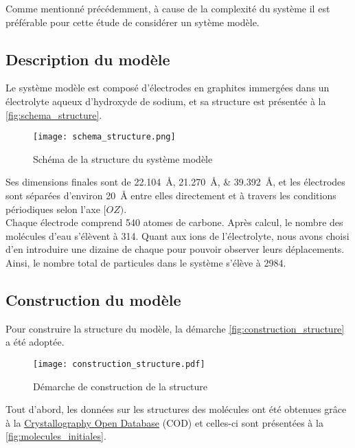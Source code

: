 Comme mentionné précédemment, à cause de la complexité du système il est préférable pour cette étude de considérer un sytème modèle.

    \subsection{Description du modèle}

Le système modèle est composé d'électrodes en graphites immergées dans un électrolyte aqueux d'hydroxyde de sodium, et sa structure est présentée à la \autoref{fig:schema_structure}.

\begin{figure}[htp]
    \centering
    \texttt{[image: schema\_structure.png]}
    \caption{Schéma de la structure du système modèle}
    \label{fig:schema_structure}
\end{figure}

Ses dimensions finales sont de \qtylist[list-units = single]{22.104;21.270;39.392}{\angstrom}, et les électrodes sont séparées d'environ \qty{20}{\angstrom} entre elles directement et à travers les conditions périodiques selon l'axe $[OZ)$.\\
Chaque électrode comprend \num{540} atomes de carbone. Après calcul, le nombre des molécules d'eau s'élèvent à \num{314}. Quant aux ions de l'électrolyte, nous avons choisi d'en introduire une dizaine de chaque pour pouvoir observer leurs déplacements.\\
Ainsi, le nombre total de particules dans le système s'élève à \num{2984}.

    \subsection{Construction du modèle}

Pour construire la structure du modèle, la démarche \autoref{fig:construction_structure} a été adoptée.

\begin{figure}[hbp]
    \centering
    \texttt{[image: construction\_structure.pdf]}
    \caption{Démarche de construction de la structure}
    \label{fig:construction_structure}
\end{figure}

Tout d'abord, les données sur les structures des molécules ont été obtenues grâce à la \href{http://www.crystallography.net/cod/}{Crystallography Open Database} (COD) et celles-ci sont présentées à la \autoref{fig:molecules_initiales}.

